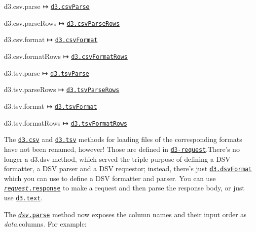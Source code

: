 \begin{DoxyItemize}
\item d3.\+csv.\+parse ↦ \href{https://github.com/d3/d3-dsv/blob/master/README.md#csvParse}{\tt d3.\+csv\+Parse}
\item d3.\+csv.\+parse\+Rows ↦ \href{https://github.com/d3/d3-dsv/blob/master/README.md#csvParseRows}{\tt d3.\+csv\+Parse\+Rows}
\item d3.\+csv.\+format ↦ \href{https://github.com/d3/d3-dsv/blob/master/README.md#csvFormat}{\tt d3.\+csv\+Format}
\item d3.\+csv.\+format\+Rows ↦ \href{https://github.com/d3/d3-dsv/blob/master/README.md#csvFormatRows}{\tt d3.\+csv\+Format\+Rows}
\item d3.\+tsv.\+parse ↦ \href{https://github.com/d3/d3-dsv/blob/master/README.md#tsvParse}{\tt d3.\+tsv\+Parse}
\item d3.\+tsv.\+parse\+Rows ↦ \href{https://github.com/d3/d3-dsv/blob/master/README.md#tsvParseRows}{\tt d3.\+tsv\+Parse\+Rows}
\item d3.\+tsv.\+format ↦ \href{https://github.com/d3/d3-dsv/blob/master/README.md#tsvFormat}{\tt d3.\+tsv\+Format}
\item d3.\+tsv.\+format\+Rows ↦ \href{https://github.com/d3/d3-dsv/blob/master/README.md#tsvFormatRows}{\tt d3.\+tsv\+Format\+Rows}
\end{DoxyItemize}

The \href{https://github.com/d3/d3-request/blob/master/README.md#csv}{\tt d3.\+csv} and \href{https://github.com/d3/d3-request/blob/master/README.md#tsv}{\tt d3.\+tsv} methods for loading files of the corresponding formats have not been renamed, however! Those are defined in \href{#requests-d3-request}{\tt d3-\/request}.There’s no longer a d3.\+dsv method, which served the triple purpose of defining a D\+SV formatter, a D\+SV parser and a D\+SV requestor; instead, there’s just \href{https://github.com/d3/d3-dsv/blob/master/README.md#dsvFormat}{\tt d3.\+dsv\+Format} which you can use to define a D\+SV formatter and parser. You can use \href{https://github.com/d3/d3-request/blob/master/README.md#request_response}{\tt {\itshape request}.response} to make a request and then parse the response body, or just use \href{https://github.com/d3/d3-request/blob/master/README.md#text}{\tt d3.\+text}.

The \href{https://github.com/d3/d3-dsv/blob/master/README.md#dsv_parse}{\tt {\itshape dsv}.parse} method now exposes the column names and their input order as {\itshape data}.columns. For example\+:


